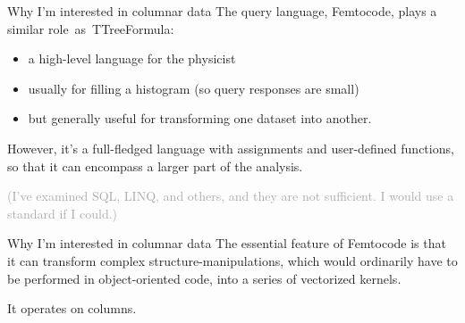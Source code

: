 \documentclass{beamer}
\begin{document}
\begin{frame}{Why I'm interested in columnar data}
The query language, Femtocode, plays a similar \mbox{role as TTreeFormula:\hspace{-1 cm}}
\begin{itemize}
\item a high-level language for the physicist
\item usually for filling a histogram (so query responses are small)
\item but generally useful for transforming one dataset into another.
\end{itemize}

\vspace{0.3 cm}
However, it's a full-fledged language with assignments and user-defined functions, so that it can encompass a larger part of the analysis.

\vspace{0.3 cm}
\textcolor{darkgray}{(I've examined SQL, LINQ, and others, and they are not sufficient. I would use a standard if I could.)}
\end{frame}

\begin{frame}{Why I'm interested in columnar data}
The essential feature of Femtocode is that it can transform complex structure-manipulations, which would ordinarily have to be performed in object-oriented code, into a series of vectorized kernels.

\vspace{0.3 cm}
It operates on columns.
\end{frame}
\end{document}
